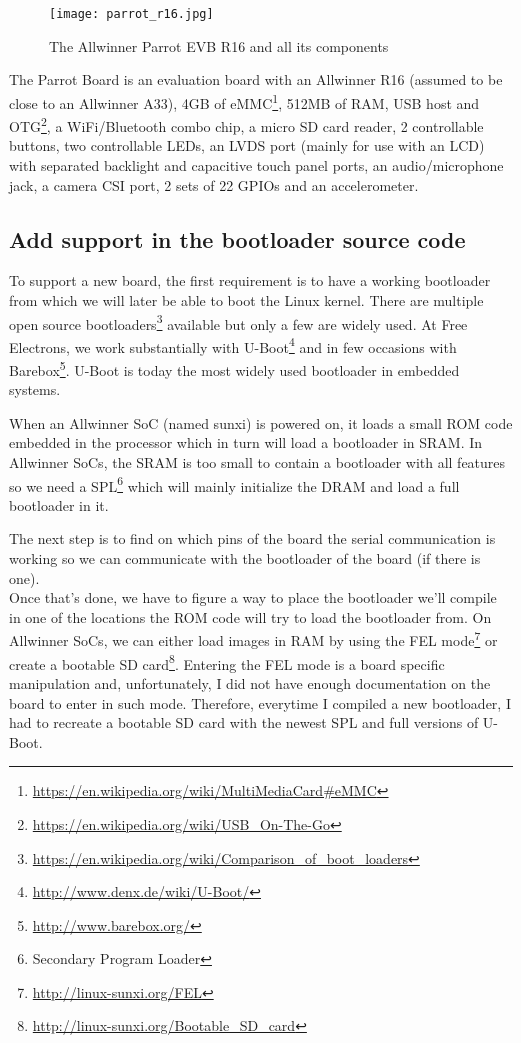 \begin{figure}[H]
  \texttt{[image: parrot\_r16.jpg]}
  \caption{The Allwinner Parrot EVB R16 and all its components}
\end{figure}

The Parrot Board is an evaluation board with an Allwinner R16 (assumed to be close to an Allwinner A33), 4GB of eMMC\footnote{\url{https://en.wikipedia.org/wiki/MultiMediaCard\#eMMC}}, 512MB of RAM, USB host and OTG\footnote{\url{https://en.wikipedia.org/wiki/USB\_On-The-Go}}, a WiFi/Bluetooth combo chip, a micro SD card reader, 2 controllable buttons, two controllable LEDs, an LVDS port (mainly for use with an LCD) with separated backlight and capacitive touch panel ports, an audio/microphone jack, a camera CSI port, 2 sets of 22 GPIOs and an accelerometer.

\subsection{Add support in the bootloader source code}
To support a new board, the first requirement is to have a working bootloader from which we will later be able to boot the Linux kernel. There are multiple open source bootloaders\footnote{\url{https://en.wikipedia.org/wiki/Comparison\_of\_boot\_loaders}} available but only a few are widely used. At Free Electrons, we work substantially with U-Boot\footnote{\url{http://www.denx.de/wiki/U-Boot/}} and in few occasions with Barebox\footnote{\url{http://www.barebox.org/}}. U-Boot is today the most widely used bootloader in embedded systems.

When an Allwinner SoC (named sunxi) is powered on, it loads a small ROM code embedded in the processor which in turn will load a bootloader in SRAM. In Allwinner SoCs, the SRAM is too small to contain a bootloader with all features so we need a SPL\footnote{Secondary Program Loader} which will mainly initialize the DRAM and load a full bootloader in it.

The next step is to find on which pins of the board the serial communication is working so we can communicate with the bootloader of the board (if there is one).\\
Once that's done, we have to figure a way to place the bootloader we'll compile in one of the locations the ROM code will try to load the bootloader from. On Allwinner SoCs, we can either load images in RAM by using the FEL mode\footnote{\url{http://linux-sunxi.org/FEL}} or create a bootable SD card\footnote{\url{http://linux-sunxi.org/Bootable\_SD\_card}}. Entering the FEL mode is a board specific manipulation and, unfortunately, I did not have enough documentation on the board to enter in such mode. Therefore, everytime I compiled a new bootloader, I had to recreate a bootable SD card with the newest SPL and full versions of U-Boot.

